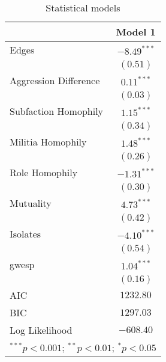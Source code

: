 
\begin{table}
\begin{center}
\begin{tabular}{l c}
\hline
 & Model 1 \\
\hline
Edges                 & $-8.49^{***}$ \\
                      & $(0.51)$      \\
Aggression Difference & $0.11^{***}$  \\
                      & $(0.03)$      \\
Subfaction Homophily  & $1.15^{***}$  \\
                      & $(0.34)$      \\
Militia Homophily     & $1.48^{***}$  \\
                      & $(0.26)$      \\
Role Homophily        & $-1.31^{***}$ \\
                      & $(0.30)$      \\
Mutuality             & $4.73^{***}$  \\
                      & $(0.42)$      \\
Isolates              & $-4.10^{***}$ \\
                      & $(0.54)$      \\
gwesp                 & $1.04^{***}$  \\
                      & $(0.16)$      \\
\hline
AIC                   & $1232.80$     \\
BIC                   & $1297.03$     \\
Log Likelihood        & $-608.40$     \\
\hline
\multicolumn{2}{l}{\scriptsize{$^{***}p<0.001$; $^{**}p<0.01$; $^{*}p<0.05$}}
\end{tabular}
\caption{Statistical models}
\label{tab:ergm-DD}
\end{center}
\end{table}
